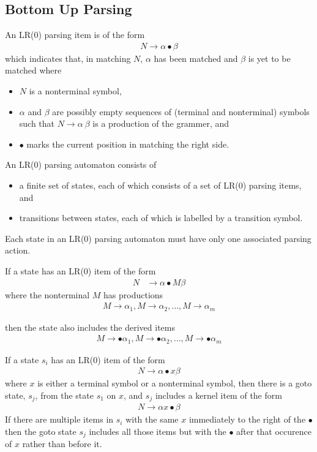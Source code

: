 \subsection{Bottom Up Parsing}
An LR(0) parsing item is of the form
\begin{align*}
    N \rightarrow \alpha \bullet \beta
\end{align*}
which indicates that, in matching $N$, $\alpha$ has been matched and $\beta$ is yet to 
be matched where
\begin{itemize}
    \item $N$ is a nonterminal symbol,
    \item $\alpha$ and $\beta$ are possibly empty sequences of (terminal and nonterminal) 
    symbols such that $N \rightarrow \alpha\ \beta$ is a production of the grammer, and
    \item $\bullet$ marks the current position in matching the right side.
\end{itemize}

An LR(0) parsing automaton consists of
\begin{itemize}
    \item a finite set of states, each of which consists of a set of LR(0) parsing items, and
    \item transitions between states, each of which is labelled by a transition symbol.
\end{itemize}
Each state in an LR(0) parsing automaton must have only one associated parsing action.

If a state has an LR(0) item of the form
\begin{align*}
    N &\rightarrow \alpha \bullet M \beta
\end{align*}
where the nonterminal $M$ has productions
\begin{align*}
    M \rightarrow \alpha_1, M \rightarrow \alpha_2, \dots, M \rightarrow \alpha_m
\end{align*}

then the state also includes the derived items
\begin{align*}
    M \rightarrow \bullet \alpha_1, M \rightarrow \bullet \alpha_2, \dots, M \rightarrow \bullet \alpha_m
\end{align*}

If a state $s_i$ has an LR(0) item of the form
\begin{align*}
    N \rightarrow \alpha \bullet x \beta
\end{align*}
where $x$ is either a terminal symbol or a nonterminal symbol, then there is a goto state, 
$s_j$, from the state $s_1$ on $x$, and $s_j$ includes a kernel item of the form
\begin{align*}
    N \rightarrow \alpha x \bullet \beta
\end{align*}
If there are multiple items in $s_i$ with the same $x$ immediately to the right of the 
$\bullet$ then the goto state $s_j$ includes all those items but with the $\bullet$ after 
that occurence of $x$ rather than before it.

